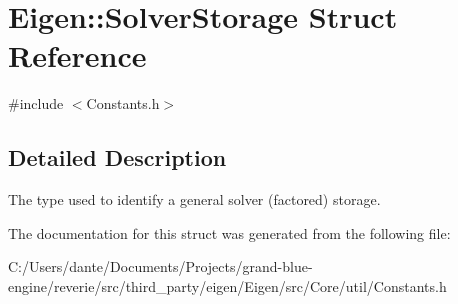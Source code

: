 \hypertarget{struct_eigen_1_1_solver_storage}{}\section{Eigen\+::Solver\+Storage Struct Reference}
\label{struct_eigen_1_1_solver_storage}


{\ttfamily \#include $<$Constants.\+h$>$}



\subsection{Detailed Description}
The type used to identify a general solver (factored) storage. 

The documentation for this struct was generated from the following file\+:\begin{DoxyCompactItemize}
\item 
C\+:/\+Users/dante/\+Documents/\+Projects/grand-\/blue-\/engine/reverie/src/third\+\_\+party/eigen/\+Eigen/src/\+Core/util/Constants.\+h\end{DoxyCompactItemize}
